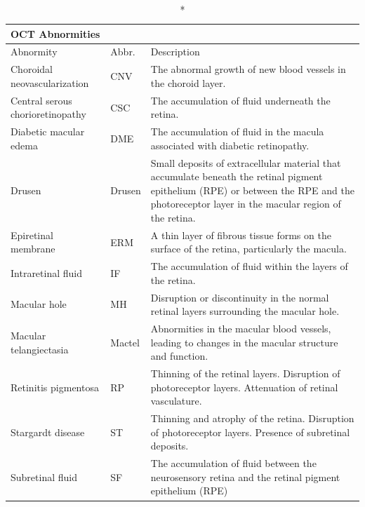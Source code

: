\documentclass{article}
\begin{document}
	{
		\fontsize{9}{12}\selectfont
		{
			\begin{longtable}{llp{9.5cm}}
				\caption*{OCT Abnormities}
				\label{tb:oct-abnormites}\\
				\toprule
				Abnormity&Abbr.&Description\\
				\toprule
				
				Choroidal neovascularization
				& CNV
				& The abnormal growth of new blood vessels in the choroid layer.\\
				
				Central serous chorioretinopathy
				& CSC
				& The accumulation of fluid underneath the retina.\\
				
				Diabetic macular edema
				& DME
				& The accumulation of fluid in the macula associated with diabetic retinopathy. \\
				
				Drusen
				& Drusen
				& Small deposits of extracellular material that accumulate beneath the retinal pigment epithelium (RPE) or between the RPE and the photoreceptor layer in the macular region of the retina.\\
				
				Epiretinal membrane
				& ERM
				& A thin layer of fibrous tissue forms on the surface of the retina, particularly the macula.\\
				
				Intraretinal fluid
				& IF
				& The accumulation of fluid within the layers of the retina.\\
				
				Macular hole
				& MH
				& Disruption or discontinuity in the normal retinal layers surrounding the macular hole.\\
				
				Macular telangiectasia
				& Mactel
				& Abnormities in the macular blood vessels, leading to changes in the macular structure and function.\\
				
				Retinitis pigmentosa
				& RP
				& Thinning of the retinal layers. Disruption of photoreceptor layers. Attenuation of retinal vasculature.\\
				
				Stargardt disease
				& ST
				& Thinning and atrophy of the retina. Disruption of photoreceptor layers. Presence of subretinal deposits.\\
				
				Subretinal fluid
				& SF
				& The accumulation of fluid between the neurosensory retina and the retinal pigment epithelium (RPE)\\
				
				\bottomrule
			\end{longtable}
		}
	}
	
\end{document}
